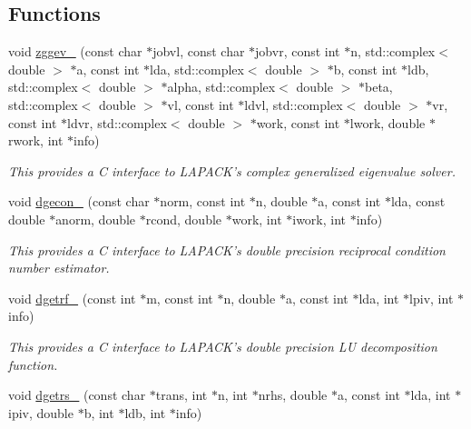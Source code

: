 \subsection*{Functions}
\begin{DoxyCompactItemize}
\item 
\hypertarget{namespacekeycpp_ace2501951ab3db3a91c3520ae89750b1}{void \hyperlink{namespacekeycpp_ace2501951ab3db3a91c3520ae89750b1}{zggev\-\_\-} (const char $\ast$jobvl, const char $\ast$jobvr, const int $\ast$n, std\-::complex$<$ double $>$ $\ast$a, const int $\ast$lda, std\-::complex$<$ double $>$ $\ast$b, const int $\ast$ldb, std\-::complex$<$ double $>$ $\ast$alpha, std\-::complex$<$ double $>$ $\ast$beta, std\-::complex$<$ double $>$ $\ast$vl, const int $\ast$ldvl, std\-::complex$<$ double $>$ $\ast$vr, const int $\ast$ldvr, std\-::complex$<$ double $>$ $\ast$work, const int $\ast$lwork, double $\ast$rwork, int $\ast$info)}\label{namespacekeycpp_ace2501951ab3db3a91c3520ae89750b1}

\begin{DoxyCompactList}\small\item\em This provides a C interface to L\-A\-P\-A\-C\-K's complex generalized eigenvalue solver. \end{DoxyCompactList}\item 
\hypertarget{namespacekeycpp_aca3be6524e195662cbb74a810305e721}{void \hyperlink{namespacekeycpp_aca3be6524e195662cbb74a810305e721}{dgecon\-\_\-} (const char $\ast$norm, const int $\ast$n, double $\ast$a, const int $\ast$lda, const double $\ast$anorm, double $\ast$rcond, double $\ast$work, int $\ast$iwork, int $\ast$info)}\label{namespacekeycpp_aca3be6524e195662cbb74a810305e721}

\begin{DoxyCompactList}\small\item\em This provides a C interface to L\-A\-P\-A\-C\-K's double precision reciprocal condition number estimator. \end{DoxyCompactList}\item 
\hypertarget{namespacekeycpp_a75e334ffaf1864d7191e9e0b64189783}{void \hyperlink{namespacekeycpp_a75e334ffaf1864d7191e9e0b64189783}{dgetrf\-\_\-} (const int $\ast$m, const int $\ast$n, double $\ast$a, const int $\ast$lda, int $\ast$lpiv, int $\ast$info)}\label{namespacekeycpp_a75e334ffaf1864d7191e9e0b64189783}

\begin{DoxyCompactList}\small\item\em This provides a C interface to L\-A\-P\-A\-C\-K's double precision L\-U decomposition function. \end{DoxyCompactList}\item 
\hypertarget{namespacekeycpp_ab9c33788a2c083aa5738eda1fe62a261}{void \hyperlink{namespacekeycpp_ab9c33788a2c083aa5738eda1fe62a261}{dgetrs\-\_\-} (const char $\ast$trans, int $\ast$n, int $\ast$nrhs, double $\ast$a, const int $\ast$lda, int $\ast$ipiv, double $\ast$b, int $\ast$ldb, int $\ast$info)}\label{namespacekeycpp_ab9c33788a2c083aa5738eda1fe62a261}


\end{DoxyCompactItemize}
